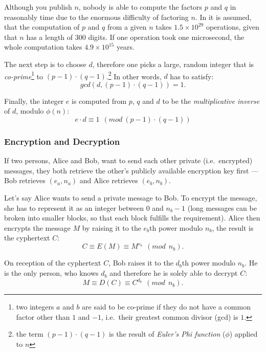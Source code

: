 Although you  publish $n$, nobody is  able to compute the  factors $p$ and
$q$ in  reasonably time due to  the enormous difficulty  of factoring $n$.
In \cite{rivest77method}  it is assumed,  that the computation of  $p$ and
$q$ from a given $n$ takes $1.5 \times 10^{29}$ operations, given that $n$
has a length  of $300$ digits. If one operation  took one microsecond, the
whole computation takes $4.9 \times 10^{15}$ years.

The  next step  is to  choose  $d$, therefore  one picks  a large,  random
integer that is \emph{co-prime}\footnote{two integers $a$ and $b$ are said
  to be co-prime  if they do not  have a common factor other  than $1$ and
  $-1$, i.e.~their greatest common divisor  (gcd) is $1$.} to $(p-1) \cdot
(q-1)$.\footnote{the term $(p-1)\cdot(q-1)$ is the result of \emph{Euler's
    Phi  function} ($\phi$) applied  to $n$}  In other  words, $d$  has to
satisfy:
\begin{equation*}
  gcd(d, (p-1) \cdot (q-1)) = 1.
\end{equation*}

Finally,  the integer $e$  is computed  from $p$,  $q$ and  $d$ to  be the
\emph{multiplicative inverse} of $d$, modulo $\phi(n)$:
\begin{equation*}
  e \cdot d \equiv 1\ \ (mod\ (p-1) \cdot (q-1))
\end{equation*}

\subsubsection{Encryption and Decryption}

If  two  persons,  Alice  and   Bob,  want  to  send  each  other  private
(i.e.~encrypted)  messages,  they   both  retrieve  the  other's  publicly
available encryption  key first ---  Bob retrieves $(e_a, n_a)$  and Alice
retrieves $(e_b, n_b)$.

Let's say  Alice wants to send a  private message to Bob.   To encrypt the
message, she has to  represent it as an integer between $0$  and $n_b - 1$
(long  messages can  be broken  into smaller  blocks, so  that  each block
fulfills the requirement). Alice then  encrypts the message $M$ by raising
it to the $e_b$th power modulo $n_b$, the result is the cyphertext $C$:
\begin{equation*}
  C \equiv E(M) \equiv M^{e_b}\ \ (mod\ \ n_b).
\end{equation*}

On reception  of the cyphertext  $C$, Bob raises  it to the  $d_b$th power
modulo $n_b$. He  is the only person, who knows $d_b$  and therefore he is
solely able to decrypt $C$:
\begin{equation*}
  M \equiv D(C) \equiv C^{d_b}\ \ (mod\ \ n_b).
\end{equation*}

